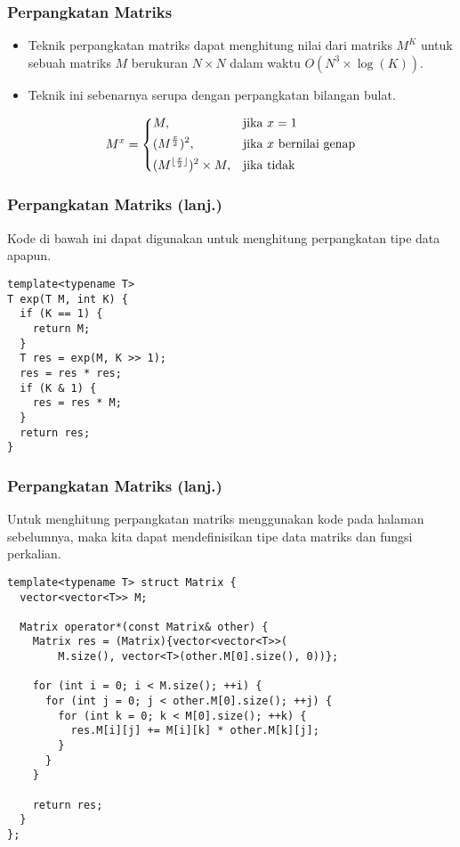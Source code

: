 \begin{frame}
\frametitle{Perpangkatan Matriks}
\begin{itemize}
  \item Teknik perpangkatan matriks dapat menghitung nilai dari matriks $M^K$ untuk sebuah matriks $M$ berukuran $N \times N$ dalam waktu $O(N^3 \times \log(K))$.
  \item Teknik ini sebenarnya serupa dengan perpangkatan bilangan bulat.
\end{itemize}
\[
    M^x= 
\begin{dcases}
    M,                                    & \text{jika } x = 1\\
    (M^{\frac{x}{2}})^2,                  & \text{jika } x \text{ bernilai genap}\\
    (M^{\lfloor \frac{x}{2} \rfloor})^2 \times M, & \text{jika tidak}
\end{dcases}
\]
\end{frame}

\begin{frame}[fragile]
\frametitle{Perpangkatan Matriks (lanj.)}
Kode di bawah ini dapat digunakan untuk menghitung perpangkatan tipe data apapun.
\newline
\begin{lstlisting}
template<typename T>
T exp(T M, int K) {
  if (K == 1) {
    return M;
  }
  T res = exp(M, K >> 1);
  res = res * res;
  if (K & 1) {
    res = res * M;
  }
  return res;
}
\end{lstlisting}
\end{frame}

\begin{frame}[fragile]
\frametitle{Perpangkatan Matriks (lanj.)}
Untuk menghitung perpangkatan matriks menggunakan kode pada halaman sebelumnya, maka kita dapat mendefinisikan tipe data matriks dan fungsi perkalian.
\begin{lstlisting}
template<typename T> struct Matrix {
  vector<vector<T>> M;

  Matrix operator*(const Matrix& other) {
    Matrix res = (Matrix){vector<vector<T>>(
        M.size(), vector<T>(other.M[0].size(), 0))};

    for (int i = 0; i < M.size(); ++i) {
      for (int j = 0; j < other.M[0].size(); ++j) {
        for (int k = 0; k < M[0].size(); ++k) {
          res.M[i][j] += M[i][k] * other.M[k][j];
        }
      }
    }

    return res;
  }
};
\end{lstlisting}
\end{frame}

